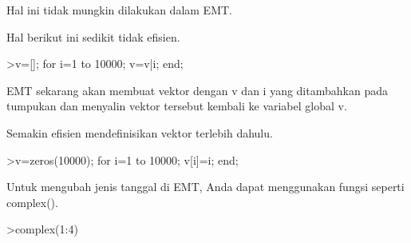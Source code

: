 \documentclass[a4paper,10pt]{article}
\begin{document}
\begin{eulernotebook}
\begin{eulercomment}
\begin{eulercomment}
\begin{eulercomment}
\begin{eulercomment}
\begin{eulercomment}
\begin{eulercomment}
\begin{eulercomment}
\begin{eulercomment}
\begin{eulercomment}
\begin{eulercomment}
\begin{eulercomment}
\begin{eulercomment}
\begin{eulercomment}
\begin{eulercomment}
\begin{eulercomment}
\begin{eulercomment}
\begin{eulercomment}
\begin{eulercomment}
\begin{eulercomment}
\begin{eulercomment}
\begin{eulercomment}
\begin{eulercomment}
\begin{eulercomment}
\begin{eulercomment}
\begin{eulercomment}
\begin{eulercomment}
\begin{eulercomment}
\begin{eulercomment}
\begin{eulercomment}
\begin{eulercomment}
\begin{eulercomment}
\begin{eulercomment}
\begin{eulercomment}
\begin{eulercomment}
\begin{eulercomment}
\begin{eulercomment}
\begin{eulercomment}
\begin{eulercomment}
\begin{eulercomment}
\begin{eulercomment}
\begin{eulercomment}
\begin{eulercomment}
\begin{eulercomment}
\begin{eulercomment}
\begin{eulercomment}
\begin{eulercomment}
\begin{eulercomment}
\begin{eulercomment}
\begin{eulercomment}
Hal ini tidak mungkin dilakukan dalam EMT.

Hal berikut ini sedikit tidak efisien.
\end{eulercomment}
\begin{eulerprompt}
>v=[]; for i=1 to 10000; v=v|i; end;
\end{eulerprompt}
\begin{eulercomment}
EMT sekarang akan membuat vektor dengan v dan i yang ditambahkan pada
tumpukan dan menyalin vektor tersebut kembali ke variabel global v.

Semakin efisien mendefinisikan vektor terlebih dahulu.
\end{eulercomment}
\begin{eulerprompt}
>v=zeros(10000); for i=1 to 10000; v[i]=i; end;
\end{eulerprompt}
\begin{eulercomment}
Untuk mengubah jenis tanggal di EMT, Anda dapat menggunakan fungsi
seperti complex().
\end{eulercomment}
\begin{eulerprompt}
>complex(1:4)
\end{eulerprompt}
\begin{euleroutput}
  [ 1+0i ,  2+0i ,  3+0i ,  4+0i  ]
\end{euleroutput}

\end{eulercomment}
\end{eulercomment}
\end{eulercomment}
\end{eulercomment}
\end{eulercomment}
\end{eulercomment}
\end{eulercomment}
\end{eulercomment}
\end{eulercomment}
\end{eulercomment}
\end{eulercomment}
\end{eulercomment}
\end{eulercomment}
\end{eulercomment}
\end{eulercomment}
\end{eulercomment}
\end{eulercomment}
\end{eulercomment}
\end{eulercomment}
\end{eulercomment}
\end{eulercomment}
\end{eulercomment}
\end{eulercomment}
\end{eulercomment}
\end{eulercomment}
\end{eulercomment}
\end{eulercomment}
\end{eulercomment}
\end{eulercomment}
\end{eulercomment}
\end{eulercomment}
\end{eulercomment}
\end{eulercomment}
\end{eulercomment}
\end{eulercomment}
\end{eulercomment}
\end{eulercomment}
\end{eulercomment}
\end{eulercomment}
\end{eulercomment}
\end{eulercomment}
\end{eulercomment}
\end{eulercomment}
\end{eulercomment}
\end{eulercomment}
\end{eulercomment}
\end{eulercomment}
\end{eulercomment}
\end{eulernotebook}
\end{document}
